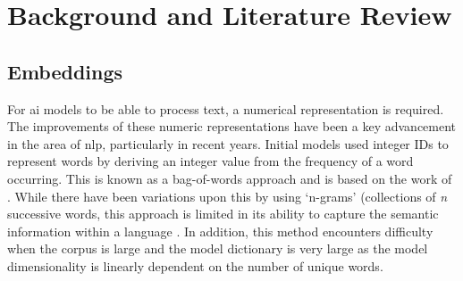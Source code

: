 \chapter{Background and Literature Review}

\label{ch:background}\label{sec:background}

\section{Embeddings}\label{sec:embeddings}
For \acrshort{ai} models to be able to process text, a numerical representation is required. The improvements of these numeric representations have been a key advancement in the area of \acrfull{nlp}, particularly in recent years. Initial models used integer IDs to represent words by deriving an integer value from the frequency of a word occurring. This is known as a bag-of-words approach and is based on the work of \citet{Zellig}. While there have been variations upon this by using `n-grams' (collections of \textit{n} successive words, this approach is limited in its ability to capture the semantic information within a language \citep{Monisha}. In addition, this method encounters difficulty when the corpus is large and the model dictionary is very large as the model dimensionality is linearly dependent on the number of unique words. 

